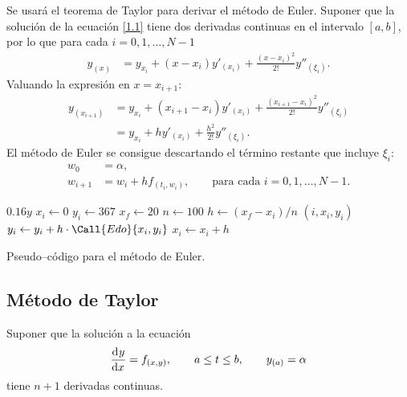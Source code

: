 \documentclass[english,spanish,Ce-table,Ce-theorem]{CabesHW}
\begin{document}
Se usará el teorema de Taylor para derivar el método de Euler. Suponer que la solución de la ecuación  \eqref{1.1} tiene dos derivadas continuas en el intervalo $[a, b]$, por lo que para cada $i = 0, 1, \ldots, N-1$
\begin{align*}
     y_{(x)} &= y_{x_i} + (x-x_i)y'_{(x_i)} + \frac{(x-x_i)^2}{2!}y''_{(\xi_i)}.
\end{align*} 
Valuando la expresión en $x=x_{i+1}$:
\begin{align*}
     y_{(x_{i+1})} &= y_{x_i} + (x_{i+1}-x_i)y'_{(x_i)} + \frac{(x_{i+1}-x_i)^2}{2!}y''_{(\xi_i)}\\
     &= y_{x_i} + hy'_{(x_i)} + \frac{h^2}{2!}y''_{(\xi_i)}.
\end{align*}
El método de Euler se consigue descartando el término restante que incluye $\xi_i$:
\begin{align*}
    w_0 &= \alpha,\\
    w_{i+1} &= w_i + h f_{(t_i, w_i)}, \qquad \text{para cada $i = 0, 1, \ldots, N-1$}.
\end{align*}


\begin{algorithm}[H]
    \centering
    \begin{myalg}[1]
        \State \Output $0.16 y$
    \EndFunction
    \State \phantom{}
    \State $x_i \gets 0$ 
    \State $y_i \gets 367$ 
    \State $x_f \gets 20$ 
    \State $n \gets 100$ 
    \State \phantom{}
    \State $h \gets (x_f - x_i)/n$ 
        \State \Output $(i, x_i, y_i)$
        \State \phantom{}
        \State $y_i \gets y_i + h\cdot\Call{Edo}{x_i, y_i}$
        \State $x_i \gets x_i + h$
    \EndFor
    \end{myalg}
    \caption{Pseudo--código para el método de Euler.}
    \label{alg:euler}
\end{algorithm}

\vspace{2em}
\subsection{Método de Taylor}
Suponer que la solución a la ecuación
\[ \td{y}{x} = f_{(x,y)}, \qquad a \leq t \leq b, \qquad y_{(a)} = \alpha \]
tiene $n+1$ derivadas continuas.
\end{document}
